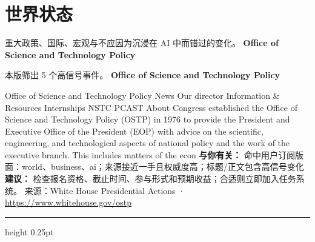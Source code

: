 \documentclass[10.5pt]{ctexart}
\begin{document}
\section*{世界状态}
{\color{ormuted} 重大政策、国际、宏观与不应因为沉浸在 AI 中而错过的变化。}
\vspace{2mm}
{\LARGE\bfseries Office of Science and Technology Policy}\par
\vspace{1mm}
{\color{ormuted} 本版筛出 5 个高信号事件。}
\vspace{3mm}
{\Large\bfseries Office of Science and Technology Policy}\par
Office of Science and Technology Policy News Our director Information \& Resources Internships NSTC PCAST About Congress established the Office of Science and Technology Policy (OSTP) in 1976 to provide the President and Executive Office of the President (EOP) with advice on the scientific, engineering, and technological aspects of national policy and the work of the executive branch. This includes matters of the econ
\textbf{与你有关：} 命中用户订阅版面：world、business、ai；来源接近一手且权威度高；标题/正文包含高信号变化
\textbf{建议：} 检查报名资格、截止时间、参与形式和预期收益；合适则立即加入任务系统。
{\footnotesize\color{ormuted} 来源：White House Presidential Actions · \url{https://www.whitehouse.gov/ostp}}
\vspace{4mm}
\hrule height 0.25pt
\vspace{3mm}
\end{document}
